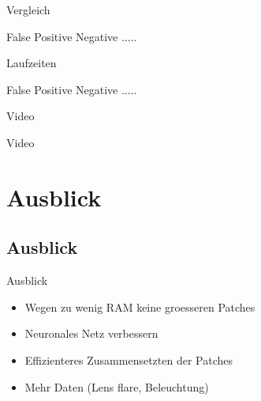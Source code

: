 \begin{frame}{Vergleich}

      False Positive Negative .....

\end{frame}

\begin{frame}{Laufzeiten}

      False Positive Negative .....

\end{frame}

\begin{frame}{Video}

      Video

\end{frame}

\section{Ausblick}
\subsection{Ausblick}
\begin{frame}{Ausblick}
    \begin{itemize}
        \item Wegen zu wenig RAM keine groesseren Patches
        \item Neuronales Netz verbessern
        \item Effizienteres Zusammensetzten der Patches
        \item Mehr Daten (Lens flare, Beleuchtung)
    \end{itemize}

\end{frame}
